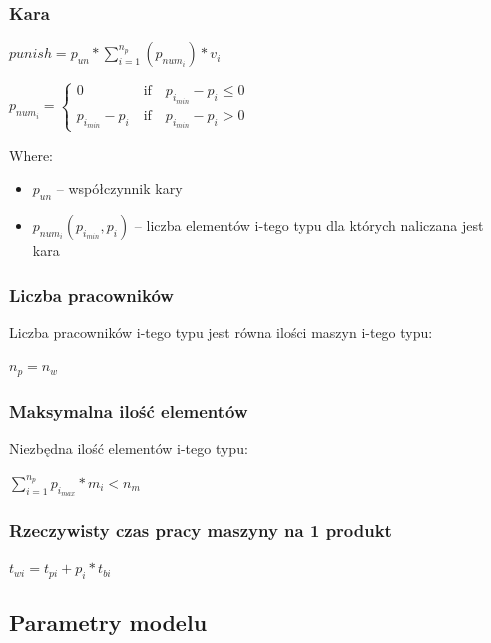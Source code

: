 \documentclass[a4paper]{article}
\begin{document}
\subsubsection{Kara}
$punish = p_{un}*\sum^{n_p}_{i=1}(p_{num_i})*v_i$

$p_{num_i}= \left\{\begin{matrix} 0  \;\quad\quad\quad\quad  \textrm{if} \quad  p_{i_{min}}-p_i \leq  0    \\ p_{i_{min}}-p_i  \quad  \textrm{if} \quad  p_{i_{min}}-p_i >  0  \end{matrix}\right.$

Where: 
\begin{itemize}
    \item $p_{un}$ -- współczynnik kary
    \item $p_{num_i}(p_{i_{min}}, p_i)$ -- liczba elementów i-tego typu dla których naliczana jest kara
\end{itemize}
\subsubsection{Liczba pracowników}

Liczba pracowników i-tego typu jest równa ilości maszyn i-tego typu:

$n_p = n_w$

\subsubsection{Maksymalna ilość elementów}\label{max-number-of-items}

Niezbędna ilość elementów i-tego typu:

$\sum^{n_p}_{i=1} p_{i_{max}} * m_i< n_m$

\subsubsection{Rzeczywisty czas pracy maszyny na 1 produkt}\label{real-working-time-of-the-i-type-machineemployee-for-one-product} $t_{wi} = t_{pi} + p_i * t_{bi}$

\subsection{Parametry modelu}\label{model-assumption}
\end{document}

